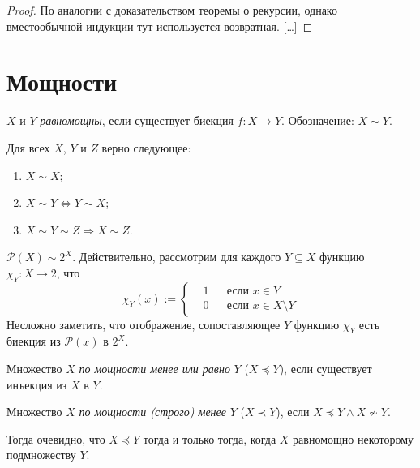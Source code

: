 \documentclass[12pt,a4paper]{article}
\newcommand{\Pcal}{\ensuremath{\mathcal{P}}\xspace}
\begin{document}
    \begin{proof}
        По аналогии с доказательством теоремы о рекурсии, однако вместообычной индукции тут используется возвратная. [\dots]
    \end{proof}

    \section{Мощности}

    \begin{definition}
        $X$ и $Y$ \emph{равномощны}, если существует биекция $f: X \to Y$. Обозначение: $X \sim Y$.
    \end{definition}

    \begin{theorem}
        Для всех $X$, $Y$ и $Z$ верно следующее:
        \begin{enumerate}
            \item $X \sim X$;
            \item $X \sim Y \Leftrightarrow Y \sim X$;
            \item $X \sim Y \sim Z \Rightarrow X \sim Z$.
        \end{enumerate}
    \end{theorem}

    \begin{example}
        $\Pcal(X) \sim 2^X$. Действительно, рассмотрим для каждого $Y \subseteq X$ функцию $\chi_Y: X \to 2$, что
        \[\chi_Y(x) := \left\{\begin{aligned}
            &1 && \text{если $x\in Y$}\\
            &0 && \text{если $x \in X \setminus Y$}
        \end{aligned}\right.\]
        Несложно заметить, что отображение, сопоставляющее $Y$ функцию $\chi_Y$ есть биекция из $\Pcal(x)$ в $2^X$.
    \end{example}

    \begin{definition}
        Множество $X$ \emph{по мощности менее или равно} $Y$ ($X \preccurlyeq Y$), если существует инъекция из $X$ в $Y$.

        Множество $X$ \emph{по мощности (строго) менее} $Y$ ($X \prec Y$), если $X \preccurlyeq Y \wedge X \nsim Y$.
    \end{definition}

    \begin{remark}
        Тогда очевидно, что $X \preccurlyeq Y$ тогда и только тогда, когда $X$ равномощно некоторому подмножеству $Y$.
    \end{remark}
\end{document}

